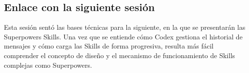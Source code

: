 \documentclass[a4paper]{article}
\begin{document}
\subsection{Enlace con la siguiente sesión}

Esta sesión sentó las bases técnicas para la siguiente, en la que se presentarán las Superpowers Skills. Una vez que se entiende cómo Codex gestiona el historial de mensajes y cómo carga las Skills de forma progresiva, resulta más fácil comprender el concepto de diseño y el mecanismo de funcionamiento de Skills complejas como Superpowers.

\end{document}
